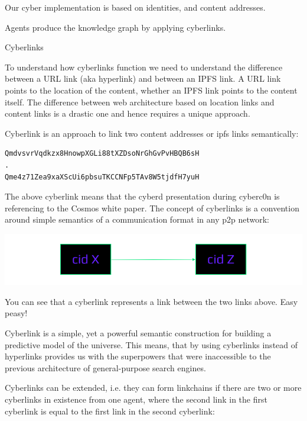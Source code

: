 \documentclass[8pt,oneside]{amsart}
\makeatletter
\newcommand{\linkred}[2]{\href{#1}{\color{red}{#2}}}
\renewcommand\subsection{\@startsection{subsection}
                                    {2}{\z@}
                                    {-3.25ex\@plus -1ex \@minus -.2ex}
                                    {0ex \@plus .2ex}
                                    {\play\Large}
                        }
\newcommand{\titleSection}[1]{\subsection{#1}}
\newcommand{\code}[1]{{\PlayBold #1}}
\newenvironment{Figure}
  {\par\medskip\noindent\minipage{\linewidth}}
  {\endminipage\par\medskip}
\makeatother
\begin{document}
Our \code{cyber} implementation is based on \linkred{https://github.com/cosmos/cosmos-sdk}{cosmos-SDK} identities, and \linkred{https://github.com/multiformats/cid#cidv0}{CIDV1} content addresses.

Agents produce the knowledge graph by applying \code{cyberlinks}.

\titleSection{Cyberlinks}\label{cyberlinks}

To understand how cyberlinks function we need to understand the difference between a URL link (aka hyperlink) and between an IPFS link. A URL link points to the location of the content, whether an IPFS link points to the content itself. The difference between web architecture based on location links and content links is a drastic one and hence requires a unique approach.

{Cyberlink} is an approach to link two content addresses or {ipfs links} semantically:

\begin{lstlisting}
QmdvsvrVqdkzx8HnowpXGLi88tXZDsoNrGhGvPvHBQB6sH
.
Qme4z71Zea9xaXScUi6pbsuTKCCNFp5TAv8W5tjdfH7yuH
\end{lstlisting}

The above cyberlink means that the cyberd presentation during cyberc0n is referencing to the Cosmos white paper. The concept of cyberlinks is a convention around simple semantics of a communication format in any p2p network:

\begin{Figure}
    \centering
    \includegraphics[width=1\textwidth]{cyberlink.png}
\end{Figure}

You can see that a cyberlink represents a link between the two links above. Easy peasy!

Cyberlink is a simple, yet a powerful semantic construction for building a predictive model of the universe. This means, that by using cyberlinks instead of hyperlinks provides us with the superpowers that were inaccessible to the previous architecture of general-purpose search engines.

Cyberlinks can be extended, i.e. they can form linkchains if there are two or more cyberlinks in existence from one agent, where the second link in the first cyberlink is equal to the first link in the second cyberlink:
\end{document}

